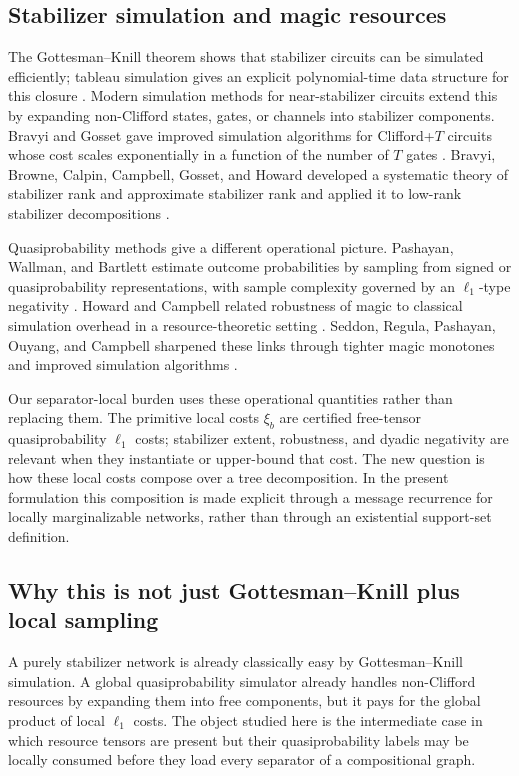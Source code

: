 \subsection{Stabilizer simulation and magic resources}

The Gottesman--Knill theorem shows that stabilizer circuits can be simulated efficiently; tableau simulation gives an explicit polynomial-time data structure for this closure \citep{AaronsonGottesman2004}. Modern simulation methods for near-stabilizer circuits extend this by expanding non-Clifford states, gates, or channels into stabilizer components. Bravyi and Gosset gave improved simulation algorithms for Clifford+\(T\) circuits whose cost scales exponentially in a function of the number of \(T\) gates \citep{BravyiGosset2016}. Bravyi, Browne, Calpin, Campbell, Gosset, and Howard developed a systematic theory of stabilizer rank and approximate stabilizer rank and applied it to low-rank stabilizer decompositions \citep{BravyiEtAl2019}.

Quasiprobability methods give a different operational picture. Pashayan, Wallman, and Bartlett estimate outcome probabilities by sampling from signed or quasiprobability representations, with sample complexity governed by an \(\ell_1\)-type negativity \citep{PashayanWallmanBartlett2015}. Howard and Campbell related robustness of magic to classical simulation overhead in a resource-theoretic setting \citep{HowardCampbell2017}. Seddon, Regula, Pashayan, Ouyang, and Campbell sharpened these links through tighter magic monotones and improved simulation algorithms \citep{SeddonEtAl2021}.

Our separator-local burden uses these operational quantities rather than replacing them. The primitive local costs \(\xi_b\) are certified free-tensor quasiprobability \(\ell_1\) costs; stabilizer extent, robustness, and dyadic negativity are relevant when they instantiate or upper-bound that cost. The new question is how these local costs compose over a tree decomposition. In the present formulation this composition is made explicit through a message recurrence for locally marginalizable networks, rather than through an existential support-set definition.

\subsection{Why this is not just Gottesman--Knill plus local sampling}

A purely stabilizer network is already classically easy by Gottesman--Knill simulation. A global quasiprobability simulator already handles non-Clifford resources by expanding them into free components, but it pays for the global product of local \(\ell_1\) costs. The object studied here is the intermediate case in which resource tensors are present but their quasiprobability labels may be locally consumed before they load every separator of a compositional graph.


